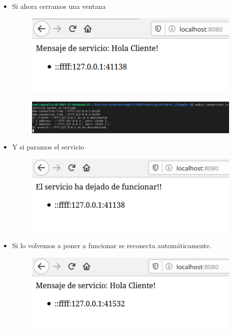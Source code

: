 \documentclass{article}
\begin{document}
\begin{itemize}
\begin{figure}[H]
		\end{figure}
		\item Si ahora cerramos una ventana
		\begin{figure}[H]
			\centering
			\includegraphics[totalheight=3cm]{img/12.png}
		\end{figure}
		\begin{figure}[H]
			\centering
			\includegraphics[totalheight=2.15cm]{img/13.png}
		\end{figure}
		\item Y si paramos el servicio
		\begin{figure}[H]
			\centering
			\includegraphics[totalheight=3cm]{img/14.png}
		\end{figure}
		\item Si lo volvemos a poner a funcionar se reconecta automáticamente.
		\begin{figure}[H]
			\centering
			\includegraphics[totalheight=3cm]{img/15.png}
		\end{figure}
	\end{itemize}
\end{document}
